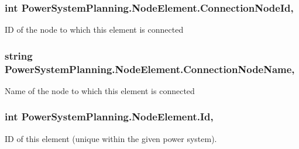 \subsubsection[{\texorpdfstring{Connection\+Node\+Id}{ConnectionNodeId}}]{\setlength{\rightskip}{0pt plus 5cm}int Power\+System\+Planning.\+Node\+Element.\+Connection\+Node\+Id\hspace{0.3cm}{\ttfamily [get]}, {\ttfamily [set]}}\hypertarget{class_power_system_planning_1_1_node_element_ad8330c198a514aa94bc329e89125796a}{}\label{class_power_system_planning_1_1_node_element_ad8330c198a514aa94bc329e89125796a}


ID of the node to which this element is connected 

\subsubsection[{\texorpdfstring{Connection\+Node\+Name}{ConnectionNodeName}}]{\setlength{\rightskip}{0pt plus 5cm}string Power\+System\+Planning.\+Node\+Element.\+Connection\+Node\+Name\hspace{0.3cm}{\ttfamily [get]}, {\ttfamily [set]}}\hypertarget{class_power_system_planning_1_1_node_element_a0649bf960bef5b6e95ab990de84caa66}{}\label{class_power_system_planning_1_1_node_element_a0649bf960bef5b6e95ab990de84caa66}


Name of the node to which this element is connected 

\subsubsection[{\texorpdfstring{Id}{Id}}]{\setlength{\rightskip}{0pt plus 5cm}int Power\+System\+Planning.\+Node\+Element.\+Id\hspace{0.3cm}{\ttfamily [get]}, {\ttfamily [set]}}\hypertarget{class_power_system_planning_1_1_node_element_aa18ee6e98501ec6c8c235058888a47e3}{}\label{class_power_system_planning_1_1_node_element_aa18ee6e98501ec6c8c235058888a47e3}


ID of this element (unique within the given power system). 

